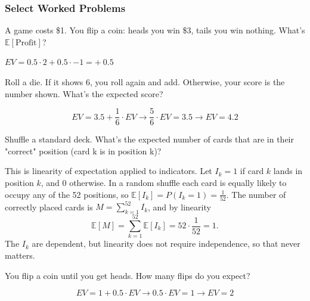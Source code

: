 \subsubsection{Select Worked Problems}

\begin{problem}
A game costs \$1. You flip a coin: heads you win \$3, tails you win nothing. What's $\mathbb{E}[\text{Profit}]$?
\end{problem}

\begin{solution}
$EV = 0.5 \cdot 2 + 0.5 \cdot -1 = +\ 0.5$
\end{solution}

\begin{problem}
Roll a die. If it shows 6, you roll again and add. Otherwise, your score is the number shown. What's the expected score?
\end{problem}

\begin{solution}
\[
EV = 3.5 + \frac{1}{6} \cdot EV \longrightarrow \frac{5}{6} \cdot EV = 3.5 \longrightarrow EV = 4.2
\]

\end{solution}

\begin{problem}
Shuffle a standard deck. What's the expected number of cards that are in their "correct" position (card k is in position k)?
\end{problem}

\begin{solution}
This is linearity of expectation applied to indicators. Let $I_k = 1$ if card $k$ lands in position $k$, and $0$ otherwise. In a random shuffle each card is equally likely to occupy any of the 52 positions, so $\mathbb{E}[I_k] = P(I_k = 1) = \frac{1}{52}$. The number of correctly placed cards is $M = \sum_{k=1}^{52} I_k$, and by linearity
\[
\mathbb{E}[M] = \sum_{k=1}^{52} \mathbb{E}[I_k] = 52 \cdot \frac{1}{52} = 1.
\]
The $I_k$ are dependent, but linearity does not require independence, so that never matters.
\end{solution}

\newpage

\begin{problem}
You flip a coin until you get heads. How many flips do you expect?
\end{problem}

\begin{solution}
\[
EV = 1 + 0.5 \cdot EV \longrightarrow 0.5 \cdot EV = 1 \longrightarrow EV = 2
\]
\end{solution}

